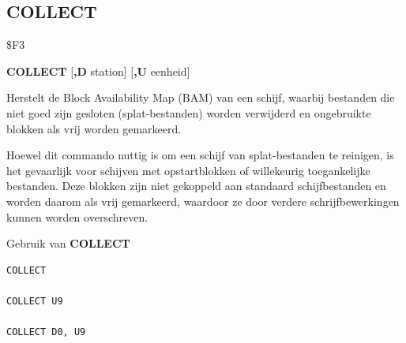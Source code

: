 \subsection{COLLECT}
\begin{description}[leftmargin=2cm,style=nextline]
\item [Token:]    \$F3

\item [Formaat:]   {\bf COLLECT} [{\bf,D} station] [{\bf,U} eenheid]

\item [Gebruik:]    Herstelt de Block Availability Map (BAM) van een schijf, waarbij bestanden die niet goed zijn gesloten (splat-bestanden) worden verwijderd en ongebruikte blokken als vrij worden gemarkeerd.

                  \drivedefinition

                  \unitdefinition

\item [Opmerkingen:]  Hoewel dit commando nuttig is om een schijf van splat-bestanden te reinigen, is het gevaarlijk voor schijven met opstartblokken of willekeurig toegankelijke bestanden. Deze blokken zijn niet gekoppeld aan standaard schijfbestanden en worden daarom als vrij gemarkeerd, waardoor ze door verdere schrijfbewerkingen kunnen worden overschreven.

\item [Voorbeelden:] Gebruik van {\bf COLLECT}

\begin{tcolorbox}[colback=black,coltext=white]
\verbatimfont{\codefont}
\begin{verbatim}
COLLECT

COLLECT U9

COLLECT D0, U9
\end{verbatim}
\end{tcolorbox}
\end{description}


\newpage

